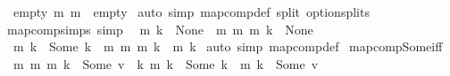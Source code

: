 \begin{isabellebody}
\ \ {\isachardoublequoteopen}empty\ {\isasymcirc}\isactrlsub m\ m\ {\isacharequal}{\kern0pt}\ empty{\isachardoublequoteclose}\isanewline
%
\isadelimproof
%
\endisadelimproof
%
\isatagproof
{}\isamarkupfalse%
\ {\isacharparenleft}{\kern0pt}auto\ simp{\isacharcolon}{\kern0pt}\ map{\isacharunderscore}{\kern0pt}comp{\isacharunderscore}{\kern0pt}def\ split{\isacharcolon}{\kern0pt}\ option{\isachardot}{\kern0pt}splits{\isacharparenright}{\kern0pt}%
\endisatagproof
{\isafoldproof}%
%
\isadelimproof
\isanewline
%
\endisadelimproof
\isanewline
{}\isamarkupfalse%
\ map{\isacharunderscore}{\kern0pt}comp{\isacharunderscore}{\kern0pt}simps\ {\isacharbrackleft}{\kern0pt}simp{\isacharbrackright}{\kern0pt}{\isacharcolon}{\kern0pt}\isanewline
\ \ {\isachardoublequoteopen}m{}\ k\ {\isacharequal}{\kern0pt}\ None\ {\isasymLongrightarrow}\ {\isacharparenleft}{\kern0pt}m{}\ {\isasymcirc}\isactrlsub m\ m{}{\isacharparenright}{\kern0pt}\ k\ {\isacharequal}{\kern0pt}\ None{\isachardoublequoteclose}\isanewline
\ \ {\isachardoublequoteopen}m{}\ k\ {\isacharequal}{\kern0pt}\ Some\ k{\isacharprime}{\kern0pt}\ {\isasymLongrightarrow}\ {\isacharparenleft}{\kern0pt}m{}\ {\isasymcirc}\isactrlsub m\ m{}{\isacharparenright}{\kern0pt}\ k\ {\isacharequal}{\kern0pt}\ m{}\ k{\isacharprime}{\kern0pt}{\isachardoublequoteclose}\isanewline
%
\isadelimproof
%
\endisadelimproof
%
\isatagproof
{}\isamarkupfalse%
\ {\isacharparenleft}{\kern0pt}auto\ simp{\isacharcolon}{\kern0pt}\ map{\isacharunderscore}{\kern0pt}comp{\isacharunderscore}{\kern0pt}def{\isacharparenright}{\kern0pt}%
\endisatagproof
{\isafoldproof}%
%
\isadelimproof
\isanewline
%
\endisadelimproof
\isanewline
{}\isamarkupfalse%
\ map{\isacharunderscore}{\kern0pt}comp{\isacharunderscore}{\kern0pt}Some{\isacharunderscore}{\kern0pt}iff{\isacharcolon}{\kern0pt}\isanewline
\ \ {\isachardoublequoteopen}{\isacharparenleft}{\kern0pt}{\isacharparenleft}{\kern0pt}m{}\ {\isasymcirc}\isactrlsub m\ m{}{\isacharparenright}{\kern0pt}\ k\ {\isacharequal}{\kern0pt}\ Some\ v{\isacharparenright}{\kern0pt}\ {\isacharequal}{\kern0pt}\ {\isacharparenleft}{\kern0pt}{\isasymexists}k{\isacharprime}{\kern0pt}{\isachardot}{\kern0pt}\ m{}\ k\ {\isacharequal}{\kern0pt}\ Some\ k{\isacharprime}{\kern0pt}\ {\isasymand}\ m{}\ k{\isacharprime}{\kern0pt}\ {\isacharequal}{\kern0pt}\ Some\ v{\isacharparenright}{\kern0pt}{\isachardoublequoteclose}\isanewline
%
\isadelimproof
%
\endisadelimproof

\end{isabellebody}
